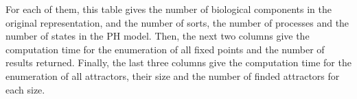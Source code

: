 \begin{changemargin}{-3cm}{-3cm}
\begin{center}
\begin{table}[ht]
\begin{center}
{For each of them, this table gives the number of biological components
in the original representation,
and the number of sorts, the number of processes
and the number of states in the PH model.
Then, the next two columns give the computation time for the enumeration of all fixed points and the number of results returned. Finally, the last three columns give the computation time for the enumeration of all attractors, their size and the number of finded attractors for each size.
}
\end{center}
\end{table}
\end{center}
\end{changemargin}
